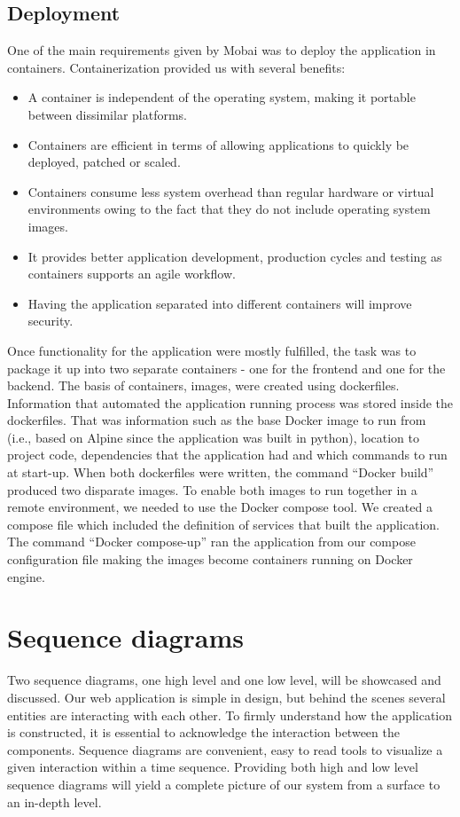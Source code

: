 \subsection{Deployment}
One of the main requirements given by Mobai was to deploy the application in containers. Containerization \cite{Containerization} provided us with several benefits:
\begin{itemize}
    \item A container is independent of the operating system, making it portable between dissimilar platforms. 
    \item Containers are efficient in terms of allowing applications to quickly be deployed, patched or scaled. 
    \item Containers consume less system overhead than regular hardware or virtual environments owing to the fact that they do not include operating system images. 
    \item It provides better application development, production cycles and testing as containers supports an agile workflow.
    \item Having the application separated into different containers will improve security. 
\end{itemize}
Once functionality for the application were mostly fulfilled, the task was to package it up into two separate containers - one for the frontend and one for the backend. The basis of containers, images, were created using dockerfiles. Information that automated the application running process was stored inside the dockerfiles. That was information such as the base Docker image to run from (i.e., based on Alpine since the application was built in python), location to project code, dependencies that the application had and which commands to run at start-up. When both dockerfiles were written, the command ``Docker build'' produced two disparate images. To enable both images to run together in a remote environment, we needed to use the Docker compose tool. We created a compose file which included the definition of services that built the application. The command ``Docker compose-up'' ran the application from our compose configuration file making the images become containers running on Docker engine.

\section{Sequence diagrams}
Two sequence diagrams, one high level and one low level, will be showcased and discussed. Our web application is simple in design, but behind the scenes several entities are interacting with each other. To firmly understand how the application is constructed, it is essential to acknowledge the interaction between the components. Sequence diagrams are convenient, easy to read tools to visualize a given interaction within a time sequence. Providing both high and low level sequence diagrams will yield a complete picture of our system from a surface to an in-depth level.

